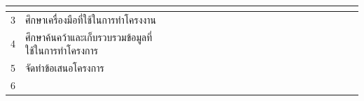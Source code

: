 \documentclass[12pt,oneside,openright,a4paper]{cpe-thai-project}
\begin{document}
\begin{table}[!h]
{\begin{tabular}{|llllllllllllllllllllll|}
      \multicolumn{1}{l|}{} &
      \multicolumn{1}{l|}{} &
      \multicolumn{1}{l|}{} &
      \multicolumn{1}{l|}{} &
      \multicolumn{1}{l|}{} &
      \multicolumn{1}{l|}{} &
      \multicolumn{1}{l|}{} &
      \multicolumn{1}{l|}{} &
       \\ \hline
    \multicolumn{1}{|l|}{3} &
      \multicolumn{1}{l|}{ศึกษาเครื่องมือที่ใช้ในการทำโครงงาน} &
      \multicolumn{1}{l|}{} &
      \multicolumn{1}{l|}{} &
      \multicolumn{1}{l|}{\cellcolor[HTML]{FFCE93}} &
      \multicolumn{1}{l|}{\cellcolor[HTML]{FFCE93}} &
      \multicolumn{1}{l|}{} &
      \multicolumn{1}{l|}{} &
      \multicolumn{1}{l|}{} &
      \multicolumn{1}{l|}{} &
      \multicolumn{1}{l|}{} &
      \multicolumn{1}{l|}{} &
      \multicolumn{1}{l|}{} &
      \multicolumn{1}{l|}{} &
      \multicolumn{1}{l|}{} &
      \multicolumn{1}{l|}{} &
      \multicolumn{1}{l|}{} &
      \multicolumn{1}{l|}{} &
      \multicolumn{1}{l|}{} &
      \multicolumn{1}{l|}{} &
      \multicolumn{1}{l|}{} &
       \\ \hline
    \multicolumn{1}{|l|}{4} &
      \multicolumn{1}{l|}{ศึกษาค้นคว้าและเก็บรวบรวมข้อมูลที่ใช้ในการทำโครงการ} &
      \multicolumn{1}{l|}{} &
      \multicolumn{1}{l|}{} &
      \multicolumn{1}{l|}{\cellcolor[HTML]{FFCE93}} &
      \multicolumn{1}{l|}{\cellcolor[HTML]{FFCE93}} &
      \multicolumn{1}{l|}{} &
      \multicolumn{1}{l|}{} &
      \multicolumn{1}{l|}{} &
      \multicolumn{1}{l|}{} &
      \multicolumn{1}{l|}{} &
      \multicolumn{1}{l|}{} &
      \multicolumn{1}{l|}{} &
      \multicolumn{1}{l|}{} &
      \multicolumn{1}{l|}{} &
      \multicolumn{1}{l|}{} &
      \multicolumn{1}{l|}{} &
      \multicolumn{1}{l|}{} &
      \multicolumn{1}{l|}{} &
      \multicolumn{1}{l|}{} &
      \multicolumn{1}{l|}{} &
       \\ \hline
    \multicolumn{1}{|l|}{5} &
      \multicolumn{1}{l|}{จัดทำข้อเสนอโครงการ} &
      \multicolumn{1}{l|}{} &
      \multicolumn{1}{l|}{} &
      \multicolumn{1}{l|}{} &
      \multicolumn{1}{l|}{} &
      \multicolumn{1}{l|}{\cellcolor[HTML]{FFCE93}} &
      \multicolumn{1}{l|}{} &
      \multicolumn{1}{l|}{} &
      \multicolumn{1}{l|}{} &
      \multicolumn{1}{l|}{} &
      \multicolumn{1}{l|}{} &
      \multicolumn{1}{l|}{} &
      \multicolumn{1}{l|}{} &
      \multicolumn{1}{l|}{} &
      \multicolumn{1}{l|}{} &
      \multicolumn{1}{l|}{} &
      \multicolumn{1}{l|}{} &
      \multicolumn{1}{l|}{} &
      \multicolumn{1}{l|}{} &
      \multicolumn{1}{l|}{} &
       \\ \hline
    \multicolumn{1}{|l|}{6} &

\end{tabular}}
\end{table}
\end{document}
